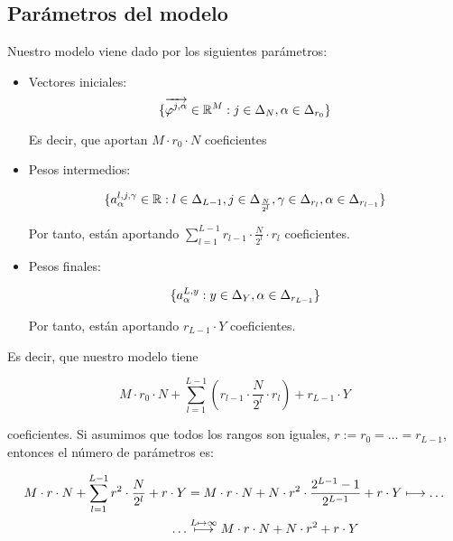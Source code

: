 \subsection{Parámetros del modelo} \label{msubs:parametros_modelo_ht}

Nuestro modelo viene dado por los siguientes parámetros:

\begin{itemize}
    \item Vectores iniciales:
        \begin{equation}
            \{\overrightarrow{\varphi^{j, \alpha}} \in \mathbb{R}^M: j \in \Delta_{N}, \alpha \in \Delta_{r_0}  \}
        \end{equation}

        Es decir, que aportan $M \cdot r_0 \cdot N$ coeficientes
    \item Pesos intermedios:

        \begin{equation}
            \{ a^{l, j, \gamma}_{\alpha} \in \mathbb{R}: l \in \Delta_{L-1}, j \in \Delta_{\frac{N}{2^l}}, \gamma \in \Delta_{r_l}, \alpha \in \Delta_{r_{l-1}} \}
        \end{equation}

        Por tanto, están aportando $\sum_{l = 1}^{L-1} r_{l-1} \cdot \frac{N}{2^l} \cdot r_l$ coeficientes.

    \item Pesos finales:

        \begin{equation}
            \{a^{L, y}_{\alpha}: y \in \Delta_{Y}, \alpha \in \Delta_{r_{L-1}} \}
        \end{equation}

        Por tanto, están aportando $r_{L-1} \cdot Y$ coeficientes.
\end{itemize}

Es decir, que nuestro modelo tiene

\begin{equation}
    M \cdot r_0 \cdot N + \sum_{l = 1}^{L-1} (r_{l-1} \cdot \frac{N}{2^l} \cdot r_l ) +
    r_{L-1} \cdot Y
\end{equation}

coeficientes. Si asumimos que todos los rangos son iguales, $r := r_0 = \ldots = r_{L-1}$, entonces el número de parámetros es:

\begin{equation}
\begin{split}
    M \cdot r \cdot N + \sum_{l = 1}^{L-1} r^2 \cdot \frac{N}{2^l} + r \cdot Y &= M \cdot r \cdot N + N \cdot r^2 \cdot \frac{2^{L-1} - 1}{2^{L-1}} + r \cdot Y \longmapsto \ldots \\
    \ldots & \stackrel{L \mapsto \infty}{\longmapsto} M \cdot r \cdot N + N \cdot r^2 + r \cdot Y
\end{split}
\end{equation}

